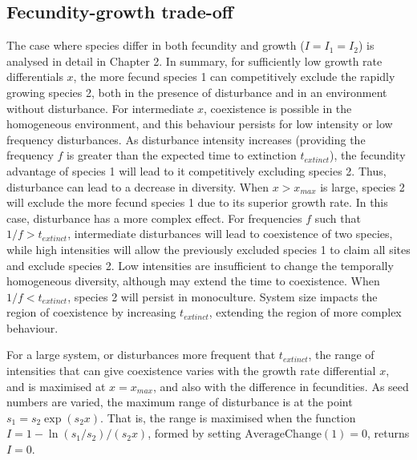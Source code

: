 \subsection{Fecundity-growth trade-off}
The case where species differ in both fecundity and growth ($I=I_1=I_2$) is analysed in detail in Chapter 2. In summary, for sufficiently low growth rate differentials $x$,  the more fecund species 1 can competitively exclude the rapidly growing species 2, both in the presence of disturbance and in an environment without disturbance. For intermediate $x$, coexistence is possible in the homogeneous environment, and this behaviour persists for low intensity or low frequency disturbances. As disturbance intensity increases (providing the frequency $f$ is greater than the expected time to extinction $t_{extinct}$), the fecundity advantage of species 1 will lead to it competitively excluding species 2. Thus, disturbance can lead to a decrease in diversity. When $x>x_{max}$ is large, species 2 will exclude the more fecund species 1 due to its superior growth rate. In this case, disturbance has a more complex effect. For frequencies $f$ such that $1/f > t_{extinct}$, intermediate disturbances will lead to coexistence of two species, while high intensities will allow the previously excluded species 1 to claim all sites and exclude species 2. Low intensities are insufficient to change the temporally homogeneous diversity, although may extend the time to coexistence. When $1/f < t_{extinct}$, species 2 will persist in monoculture. System size impacts the region of coexistence by increasing $t_{extinct}$, extending the region of more complex behaviour.

For a large system, or disturbances more frequent that $t_{extinct}$, the range of intensities that can give coexistence varies with the growth rate differential $x$, and is maximised at $x=x_{max}$, and also with the difference in fecundities. As seed numbers are varied, the maximum range of disturbance is at the point $s_1=s_2\exp(s_2x)$. That is, the range is maximised when the function $I=1-\ln(s_1/s_2)/(s_2x)$, formed by setting $\text{AverageChange}(1)=0$, returns $I=0$.

